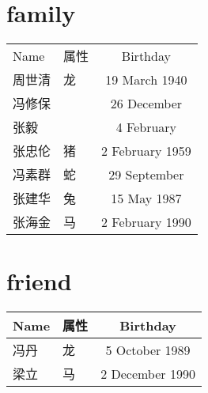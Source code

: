 \documentclass{ctexart}
\begin{document}
\section{family}
\begin{NiceTabular}{llc}
  \toprule
  Name & 属性 & Birthday \\
  周世清 & 龙 & 19 March 1940 \\
  冯修保 &    & 26 December \\
  张毅 & & 4 February \\
  张忠伦 & 猪 & 2 February 1959 \\
  冯素群 & 蛇 & 29 September \\

  张建华 & 兔 & 15 May 1987 \\
  张海金 & 马 & 2 February 1990 \\
  \midrule
  \bottomrule
  
\end{NiceTabular}

\section{friend}
\begin{NiceTabular}{llc}
  \toprule
  Name & 属性 & Birthday \\
  \midrule
  冯丹 & 龙 & 5 October 1989 \\
  梁立 & 马 & 2 December 1990 \\
  \bottomrule
  
\end{NiceTabular}
\end{document}
